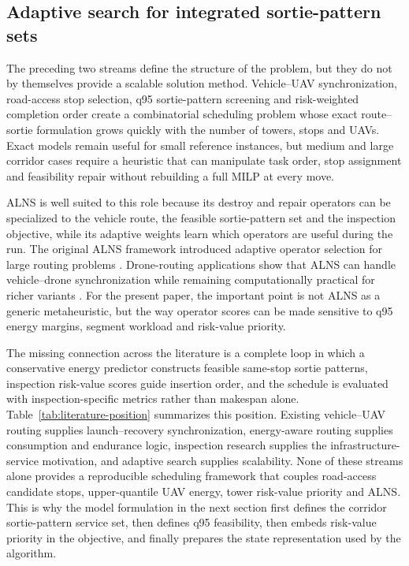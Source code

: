 \subsection{Adaptive search for integrated sortie-pattern sets}

The preceding two streams define the structure of the problem, but they do not by themselves provide a scalable solution method. Vehicle--UAV synchronization, road-access stop selection, q95 sortie-pattern screening and risk-weighted completion order create a combinatorial scheduling problem whose exact route--sortie formulation grows quickly with the number of towers, stops and UAVs. Exact models remain useful for small reference instances, but medium and large corridor cases require a heuristic that can manipulate task order, stop assignment and feasibility repair without rebuilding a full MILP at every move.

ALNS is well suited to this role because its destroy and repair operators can be specialized to the vehicle route, the feasible sortie-pattern set and the inspection objective, while its adaptive weights learn which operators are useful during the run. The original ALNS framework introduced adaptive operator selection for large routing problems \citep{ropke2006alns}. Drone-routing applications show that ALNS can handle vehicle--drone synchronization while remaining computationally practical for richer variants \citep{sacramento2019alns,asoc2023recharging}. For the present paper, the important point is not ALNS as a generic metaheuristic, but the way operator scores can be made sensitive to q95 energy margins, segment workload and risk-value priority.

The missing connection across the literature is a complete loop in which a conservative energy predictor constructs feasible same-stop sortie patterns, inspection risk-value scores guide insertion order, and the schedule is evaluated with inspection-specific metrics rather than makespan alone. Table~\ref{tab:literature-position} summarizes this position. Existing vehicle--UAV routing supplies launch--recovery synchronization, energy-aware routing supplies consumption and endurance logic, inspection research supplies the infrastructure-service motivation, and adaptive search supplies scalability. None of these streams alone provides a reproducible scheduling framework that couples road-access candidate stops, upper-quantile UAV energy, tower risk-value priority and ALNS. This is why the model formulation in the next section first defines the corridor sortie-pattern service set, then defines q95 feasibility, then embeds risk-value priority in the objective, and finally prepares the state representation used by the algorithm.

